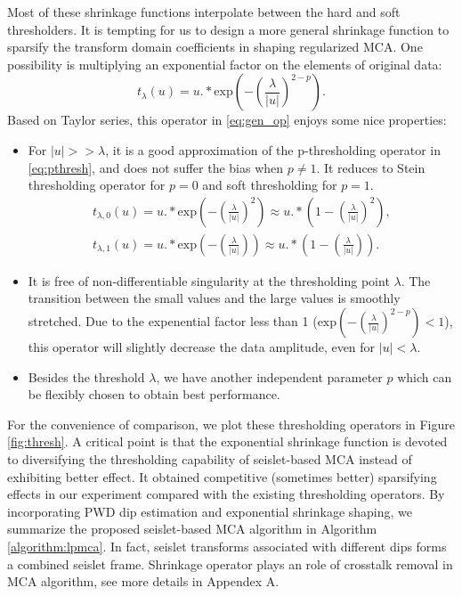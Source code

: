 Most of these shrinkage functions interpolate between the hard and soft thresholders. It is tempting for us to design a more general shrinkage function to sparsify the transform domain coefficients in shaping regularized MCA. One possibility is  multiplying an exponential factor on the elements of original data:
\begin{equation}\label{eq:gen_op}
t_{\lambda}(u)=u.*\mathrm{exp}(-(\frac{\lambda}{|u|})^{2-p}).
\end{equation}
Based on Taylor series, this operator in \eqref{eq:gen_op} enjoys some nice properties:
\begin{itemize}
 \item For $|u|>>\lambda$, it is a good approximation of the p-thresholding operator in \eqref{eq:pthresh}, and does not suffer the bias when $p\neq 1$. It reduces to Stein thresholding operator for $p=0$ and soft thresholding for $p=1$. 
  \begin{equation}\label{eq:exp_sergey} 
  \begin{split}   
  t_{\lambda,0}(u)=u.*\mathrm{exp}(-(\frac{\lambda}{|u|})^{2})\approx u.*(1-(\frac{\lambda}{|u|})^{2}),\\
  t_{\lambda,1}(u)=u.*\mathrm{exp}(-(\frac{\lambda}{|u|}))\approx u.*(1-(\frac{\lambda}{|u|})).
  \end{split}
\end{equation}
 \item It is free of non-differentiable singularity at the thresholding point $\lambda$. The transition between the small values and the large values is smoothly stretched. Due to the expenential factor less than 1 ($\mathrm{exp}(-(\frac{\lambda}{|u|})^{2-p})<1$), this operator will slightly decrease the data amplitude, even for $|u|<\lambda$.
 \item Besides the threshold $\lambda$, we have another independent parameter $p$ which can be flexibly chosen to obtain best performance.
\end{itemize}
For the convenience of comparison, we plot these thresholding operators in Figure \ref{fig:thresh}. A critical point is that the exponential shrinkage function is devoted to diversifying the thresholding capability of seislet-based MCA instead of exhibiting better effect. It obtained competitive (sometimes better) sparsifying effects in our experiment compared with the existing thresholding operators.  By incorporating PWD dip estimation and exponential shrinkage shaping, we summarize the proposed seislet-based MCA algorithm in Algorithm \ref{algorithm:lpmca}. In fact, seislet transforms associated with different dips forms a combined seislet frame. Shrinkage operator plays an role of crosstalk removal in MCA algorithm, see more details in Appendex A.

